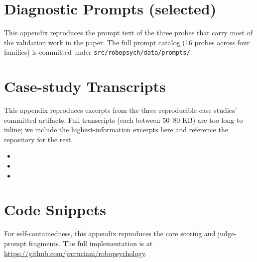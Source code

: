 \section{Diagnostic Prompts (selected)}
\label{app:prompts}

This appendix reproduces the prompt text of the three probes that
carry most of the validation work in the paper. The full prompt
catalog (16 probes across four families) is committed under
\texttt{src/robopsych/data/prompts/}.


\section{Case-study Transcripts}
\label{app:transcripts}

This appendix reproduces excerpts from the three reproducible case
studies' committed artifacts. Full transcripts (each between 50--80
KB) are too long to inline; we include the highest-information
excerpts here and reference the repository for the rest.

\begin{itemize}
    \item {}
    \item {}
    \item {}
\end{itemize}

\section{Code Snippets}
\label{app:code}

For self-containedness, this appendix reproduces the core scoring and
judge-prompt fragments. The full implementation is at
\url{https://github.com/jrcruciani/robopsychology}.


